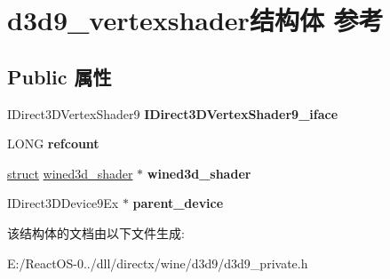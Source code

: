 \hypertarget{structd3d9__vertexshader}{}\section{d3d9\+\_\+vertexshader结构体 参考}
\label{structd3d9__vertexshader}
\subsection*{Public 属性}
\begin{DoxyCompactItemize}
\item 
\mbox{\label{structd3d9__vertexshader_af119437188ecadd49b8ca87d1029ff88}} 
I\+Direct3\+D\+Vertex\+Shader9 {\bfseries I\+Direct3\+D\+Vertex\+Shader9\+\_\+iface}
\item 
\mbox{\label{structd3d9__vertexshader_a2878b0869fc5a4afc1d3be5ec6469d65}} 
L\+O\+NG {\bfseries refcount}
\item 
\mbox{\label{structd3d9__vertexshader_a04a103712248df2cfb19865198285cbd}} 
\hyperlink{interfacestruct}{struct} \hyperlink{structwined3d__shader}{wined3d\+\_\+shader} $\ast$ {\bfseries wined3d\+\_\+shader}
\item 
\mbox{\label{structd3d9__vertexshader_a720b90de539a70dbcfafc5d39d332c01}} 
I\+Direct3\+D\+Device9\+Ex $\ast$ {\bfseries parent\+\_\+device}
\end{DoxyCompactItemize}


该结构体的文档由以下文件生成\+:\begin{DoxyCompactItemize}
\item 
E\+:/\+React\+O\+S-\/0../dll/directx/wine/d3d9/d3d9\+\_\+private.\+h\end{DoxyCompactItemize}
